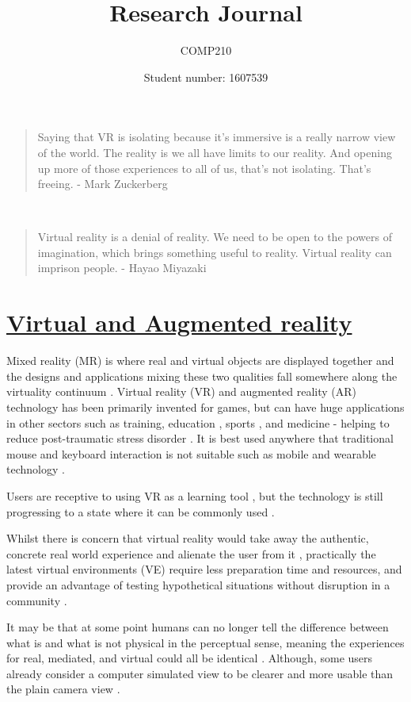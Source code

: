 \documentclass{scrartcl}
\title
{Research Journal}
\subtitle{COMP210}
\author{Student number: 1607539}
\begin{document}
\maketitle

\blockquote {Saying that VR is isolating because it's immersive is a really narrow view of the world. The reality is we all have limits to our reality. And opening up more of those experiences to all of us, that's not isolating. That's freeing. - Mark Zuckerberg}\\
\indent\blockquote {Virtual reality is a denial of reality. We need to be open to the powers of imagination, which brings something useful to reality. Virtual reality can imprison people. - Hayao Miyazaki}

\section*{\underline{Virtual and Augmented reality}}

Mixed reality (MR) is where real and virtual objects are displayed together \cite{milgram1994taxonomy} and the designs and applications mixing these two qualities fall somewhere along the virtuality continuum \cite{venta2014investigating}. Virtual reality (VR) and augmented reality (AR) technology has been primarily invented for games, but can have huge applications in other sectors such as training, education \cite{mentzelopoulos2015hardware}, sports \cite{azuma2001recent}, and medicine - helping to reduce post-traumatic stress disorder \cite{rothbaum2001virtual}. It is best used anywhere that traditional mouse and keyboard interaction is not suitable such as mobile and wearable technology \cite{keir2006gesture}. 

Users are receptive to using VR as a learning tool \cite{blackledge2012evaluation}, but the technology is still progressing to a state where it can be commonly used \cite{huang2013mobile}.

Whilst there is concern that virtual reality would take away the authentic, concrete real world experience and alienate the user from it \cite{venta2014investigating}, practically the latest virtual environments (VE) require less preparation time and resources, and provide an advantage of testing hypothetical situations without disruption in a community \cite{hvannberg2012exploitation}.

It may be that at some point humans can no longer tell the difference between what is and what is not physical in the perceptual sense, meaning the experiences for real, mediated, and virtual could all be identical \cite{rosa2016re}. Although, some users already consider a computer simulated view to be clearer and more usable than the plain camera view \cite{venta2014investigating}.
\end{document}
